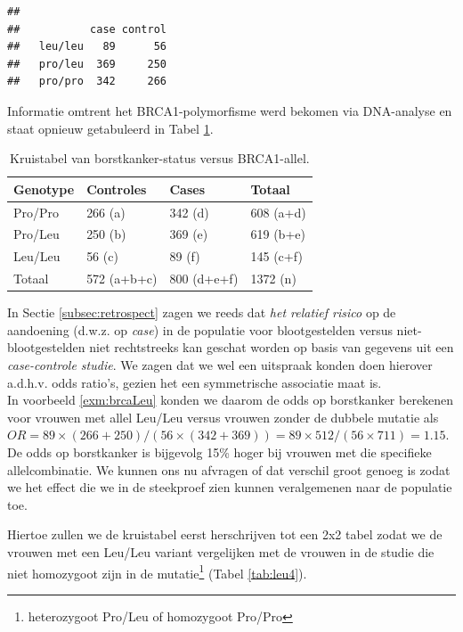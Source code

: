 \documentclass[
  12pt,dutch]{book}
\newenvironment{Shaded}{\begin{snugshade}}{\end{snugshade}}
\newcommand{\FunctionTok}[1]{\textcolor[rgb]{0.13,0.29,0.53}{\textbf{#1}}}
\newcommand{\NormalTok}[1]{#1}
\newcommand{\OtherTok}[1]{\textcolor[rgb]{0.56,0.35,0.01}{#1}}
\newcommand{\SpecialCharTok}[1]{\textcolor[rgb]{0.81,0.36,0.00}{\textbf{#1}}}
\theoremstyle{definition}
\theoremstyle{definition}
\theoremstyle{definition}
\theoremstyle{definition}
\theoremstyle{remark}
\begin{document}
\begin{verbatim}
##          
##           case control
##   leu/leu   89      56
##   pro/leu  369     250
##   pro/pro  342     266
\end{verbatim}

Informatie omtrent het BRCA1-polymorfisme werd bekomen via DNA-analyse en staat opnieuw getabuleerd in Tabel \ref{tab:leu3}.

\begin{table}

\caption{\label{tab:leu3}Kruistabel van borstkanker-status versus BRCA1-allel.}
\centering
\begin{tabular}[t]{llll}
\toprule
Genotype & Controles & Cases & Totaal\\
\midrule
Pro/Pro & 266 (a) & 342 (d) & 608 (a+d)\\
Pro/Leu & 250 (b) & 369 (e) & 619 (b+e)\\
Leu/Leu & 56 (c) & 89 (f) & 145 (c+f)\\
Totaal & 572 (a+b+c) & 800 (d+e+f) & 1372 (n)\\
\bottomrule
\end{tabular}
\end{table}

In Sectie \ref{subsec:retrospect} zagen we reeds dat \emph{het relatief risico} op de aandoening (d.w.z. op \emph{case})
in de populatie voor blootgestelden versus niet-blootgestelden niet rechtstreeks kan geschat worden op basis van gegevens uit een \emph{case-controle studie}.
We zagen dat we wel een uitspraak konden doen hierover a.d.h.v. odds ratio's, gezien het een symmetrische associatie maat is.\\
In voorbeeld \ref{exm:brcaLeu} konden we daarom de odds op borstkanker berekenen voor vrouwen met allel Leu/Leu
versus vrouwen zonder de dubbele mutatie als \(OR=89\times (266+250)/(56\times (342+369))=89\times 512/(56 \times 711)=1.15\).
De odds op borstkanker is bijgevolg 15\% hoger bij vrouwen met die specifieke allelcombinatie.
We kunnen ons nu afvragen of dat verschil groot genoeg is zodat we het effect die we in de steekproef zien kunnen veralgemenen naar de populatie toe.

Hiertoe zullen we de kruistabel eerst herschrijven tot een 2x2 tabel zodat we de vrouwen met een Leu/Leu variant vergelijken met de vrouwen in de studie die niet homozygoot zijn in de mutatie\footnote{heterozygoot Pro/Leu of homozygoot Pro/Pro} (Tabel \ref{tab:leu4}).

\begin{Shaded}
\end{Shaded}
\end{document}
